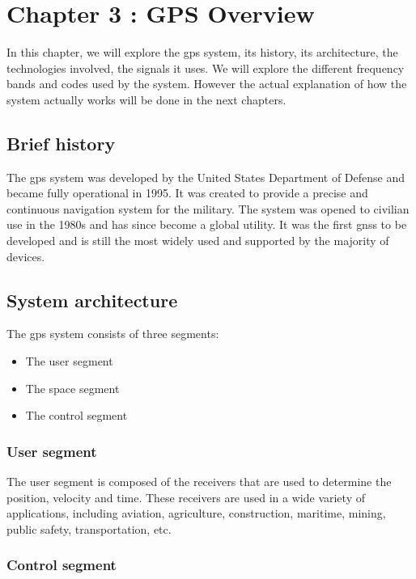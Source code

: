\chapter{Chapter 3 : GPS Overview}

In this chapter, we will explore the \gls{gps} system, its history, its architecture, the technologies involved, the signals it uses. We will explore the different frequency bands and codes used by the system. However the actual explanation of how the system actually works will be done in the next chapters.

\section{Brief history}

The \gls{gps} system was developed by the United States Department of Defense and became fully operational in 1995. It was created to provide a precise and continuous navigation system for the military. The system was opened to civilian use in the 1980s and has since become a global utility. It was the first \gls{gnss} to be developed and is still the most widely used and supported by the majority of devices.

\section{System architecture}

The \gls{gps} system consists of three segments:
\begin{itemize}
	\item The user segment
	\item The space segment
	\item The control segment
\end{itemize}


\subsection{User segment}

The user segment is composed of the receivers that are used to determine the position, velocity and time. These receivers are used in a wide variety of applications, including aviation, agriculture, construction, maritime, mining, public safety, transportation, etc.

\newpage

\subsection{Control segment}

